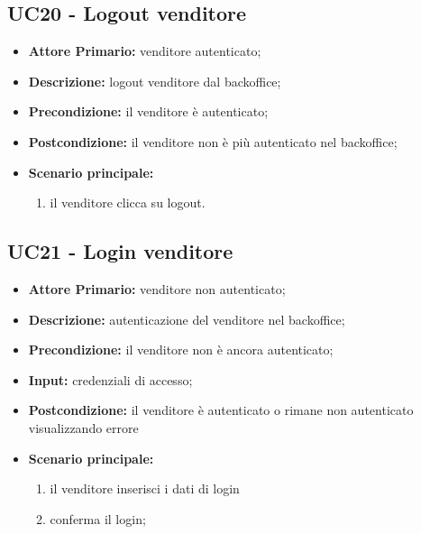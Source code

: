 \subsection{UC20 - Logout venditore}
\begin{itemize}
    \item \textbf{Attore Primario:} venditore autenticato;
    \item \textbf{Descrizione:} logout venditore dal backoffice;
    \item \textbf{Precondizione:} il venditore è autenticato;
    \item \textbf{Postcondizione:} il venditore non è più autenticato nel backoffice;
    \item \textbf{Scenario principale:}
    \begin{enumerate}
        \item il venditore clicca su logout.
    \end{enumerate}
\end{itemize}

\subsection{UC21 - Login venditore}
\begin{itemize}
    \item \textbf{Attore Primario:} venditore non autenticato;
    \item \textbf{Descrizione:} autenticazione del venditore nel backoffice;
    \item \textbf{Precondizione:} il venditore non è ancora autenticato;
    \item \textbf{Input:} credenziali di accesso;
    \item \textbf{Postcondizione:} il venditore è autenticato o rimane non autenticato visualizzando errore
    \item \textbf{Scenario principale:}
    \begin{enumerate}
        \item il venditore inserisci i dati di login
        \item conferma il login;
    \end{enumerate}
\end{itemize}


